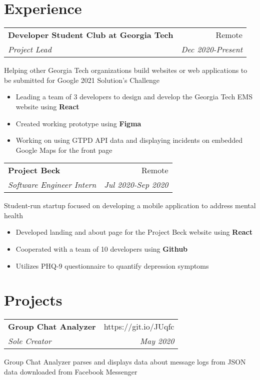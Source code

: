 \documentclass[letterpaper,8pt]{article}
\makeatletter
\newcommand{\resumeSubheading}[4]{
  \vspace{0.25em}
  \begin{tabular*}{1\textwidth}[t]{l@{\extracolsep{\fill}}r}
    \textbf{#1} & #2 \\
    \textit{#3} & \textit{#4} \\
  \end{tabular*}\vspace{-5pt}
}
\makeatother
\begin{document}
\vspace{5pt}
\section{Experience}

\resumeSubheading{Developer Student Club at Georgia Tech}{Remote}{Project Lead}{Dec 2020-Present}

Helping other Georgia Tech organizations build websites or web applications to be submitted for Google 2021 Solution's Challenge

\begin{itemize}[label=\raisebox{0.25ex}{\tiny$\bullet$}]
    \item Leading a team of 3 developers to design and develop the Georgia Tech EMS website using \textbf{React}
    \item Created working prototype using \textbf{Figma}
    \item Working on using GTPD API data and displaying incidents on embedded Google Maps for the front page
\end{itemize}
\vspace{5pt}

\resumeSubheading{Project Beck}{Remote}{Software Engineer Intern}{Jul 2020-Sep 2020}

Student-run startup focused on developing a mobile application to address mental health

\begin{itemize}[label=\raisebox{0.25ex}{\tiny$\bullet$}]
  \item Developed landing and about page for the Project Beck website using \textbf{React}
  \item Cooperated with a team of 10 developers using \textbf{Github}
  \item Utilizes PHQ-9 questionnaire to quantify depression symptoms
\end{itemize}
\vspace{5pt}

\section{Projects}

\resumeSubheading{Group Chat Analyzer}{https://git.io/JUqfc}{Sole Creator}{May 2020}

Group Chat Analyzer parses and displays data about message logs from JSON data downloaded from Facebook Messenger
\end{document}
